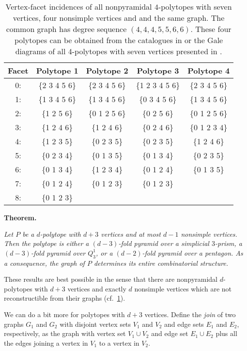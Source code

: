 \documentclass[a4paper]{amsart}
\theoremstyle{definition}
\theoremstyle{remark}
\begin{document}
\begin{table}
\begin{tabular}{c c c c c}
{Facet}&{Polytope 1}&{Polytope 2}&{Polytope 3}&Polytope 4\\
\hline
 0:&\{2 3 4 5 6\}&\{2 3 4 5 6\}&\{1 2 3 4 5 6\}&\{2 3 4 5 6\}\\
1:&\{1 3 4 5 6\}&\{1 3 4 5 6\}&\{0 3 4 5 6\}&\{1 3 4 5 6\}\\
2:&\{1 2 5 6\}&\{0 1 2 5 6\}&\{0 2 5 6\}&\{0 1 2 5 6\}\\
3:&\{1 2 4 6\}&\{1 2 4 6\}&\{0 2 4 6\}&\{0 1 2 3 4\}\\
4:&\{1 2 3 5\}&\{0 2 3 5\}&\{0 2 3 5\}&\{1 2 4 6\}\\
5:&\{0 2 3 4\}&\{0 1 3 5\}&\{0 1 3 4\}&\{0 2 3 5\}\\
6:&\{0 1 3 4\}&\{1 2 3 4\}&\{0 1 2 4\}&\{0 1 3 5\}\\
7:&\{0 1 2 4\}&\{0 1 2 3\}&\{0 1 2 3\}\\
8:&\{0 1 2 3\}\\
\hline
\end{tabular}
\caption{Vertex-facet incidences of all nonpyramidal $4$-polytopes with seven vertices, four nonsimple vertices and  and the same graph. The common graph has degree sequence $(4,4,4,5,5,6,6)$. These four polytopes can be obtained from the catalogues  in \cite{FukMiyMor13a} or the Gale diagrams of all 4-polytopes with seven vertices presented in \cite[Fig.~5]{Gru70}.}
\label{tab:4Polytopes7Vertices4Nonsimple}
\end{table}
	
	
{\bf Theorem.}{ \it Let $P$ be a $d$-polytope with $d+3$ vertices and  at most $d-1$ nonsimple vertices. Then the polytope is either a  $(d-3)$-fold  pyramid over  a simplicial $3$-prism,  a $(d-3)$-fold  pyramid over  $Q^1_3$,  or a $(d-2)$-fold pyramid over a pentagon. As a consequence, the graph of $P$ determines its entire combinatorial structure. 

These results are best possible in the sense that there are nonpyramidal  $d$-polytopes with $d+3$ vertices and exactly $d$ nonsimple vertices which are not reconstructible from their graphs (cf.~\cref{tab:4Polytopes7Vertices4Nonsimple}).
}

We can do a bit more for polytopes with $d+3$ vertices. Define the  {\it join} of two graphs $G_1$ and $G_2$ with disjoint vertex sets $V_1$ and $V_2$ and edge sets $E_1$ and $E_2$, respectively, as the graph with vertex set $V_1\cup V_2$ and edge set $E_1\cup E_2$ plus all the edges joining a vertex in $V_1$ to a vertex  in $V_2$.
\end{document}
